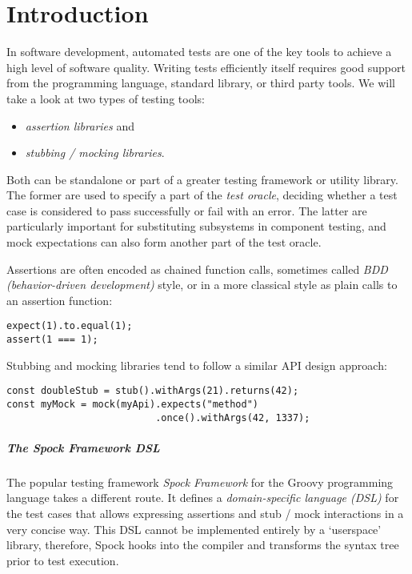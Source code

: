 \chapter{Introduction}
In software development, automated tests are one of the key tools
to achieve a high level of software quality.
Writing tests efficiently itself requires good support
from the programming language, standard library, or third party tools.
We will take a look at two types of testing tools:
\begin{itemize}
  \item \textit{assertion libraries} and
  \item \textit{stubbing / mocking libraries}.
\end{itemize}
Both can be standalone or part of a greater testing framework or utility library.
The former are used to specify a part of the \textit{test oracle},
deciding whether a test case is considered to pass successfully or fail with an error.
The latter are particularly important for substituting subsystems in component testing,
and mock expectations can also form another part of the test oracle.

Assertions are often encoded as chained function calls,
sometimes called \textit{BDD (behavior-driven development)} style,
or in a more classical style as plain calls to an assertion function:
\autocite{ChaiBddDoc}\autocite{ChaiTddDoc}
\begin{verbatim}
expect(1).to.equal(1);
assert(1 === 1);
\end{verbatim}
Stubbing and mocking libraries tend to follow a similar API design approach:
\autocite{SinonStubDoc}\autocite{SinonMockDoc}
\begin{verbatim}
const doubleStub = stub().withArgs(21).returns(42);
const myMock = mock(myApi).expects("method")
                          .once().withArgs(42, 1337);
\end{verbatim}

\paragraph{The Spock Framework DSL}
The popular testing framework \textit{Spock Framework}
for the Groovy programming language takes a different route.
It defines a \textit{domain-specific language (DSL)} for the test cases
that allows expressing assertions and stub / mock interactions in a very concise way.
This DSL cannot be implemented entirely by a `userspace' library, therefore,
Spock hooks into the compiler and transforms the syntax tree prior to test execution.
